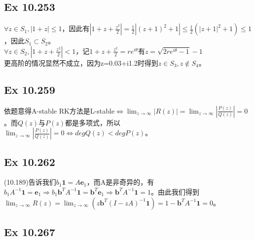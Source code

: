 \documentclass{article}
\begin{document}
\subsection*{Ex 10.253}
\indent $\forall z\in S_1,|1+z|\le 1$，因此有$|1+z+\frac{z^2}{2}|=\frac{1}{2}|(z+1)^2+1|\le \frac{1}{2}(|z+1|^2+1)\le1$，因此$S_1\subset S_2$。\\
\indent $\forall z\in S_2,|1+z+\frac{z^2}{2}|<1$，记$1+z+\frac{z^2}{2}=re^{i\theta}$有$z=\sqrt{2re^{i\theta}-1}-1$\\
\indent 更高阶的情况显然不成立，因为z=0.03+i1.2时得到$z\in S_3,z\notin S_4$。


\subsection*{Ex 10.259}
\indent 依题意得A-stable RK方法是L-stable$\Leftrightarrow$$\lim_{z\rightarrow\infty}|R(z)|=\lim_{z\rightarrow\infty}|\frac{P(z)}{Q(z)}|=0$。而$Q(z)$与$P(z)$都是多项式，所以$\lim_{z\rightarrow\infty}|\frac{P(z)}{Q(z)}|=0\Leftrightarrow degQ(z)<degP(z)$。

\subsection*{Ex 10.262}
\indent (10.189)告诉我们$b_1\textbf{1}=A\textbf{e}_1$，而A是非奇异的，有$b_1A^{-1}\textbf{1}=\textbf{e}_1\Rightarrow b_1\textbf{b}^TA^{-1}\textbf{1}=\textbf{b}^T\textbf{e}_1\Rightarrow\textbf{b}^TA^{-1}\textbf{1}=1$。由此我们得到$\lim_{z\rightarrow\infty}R(z)=\lim_{z\rightarrow\infty}(z\textbf{b}^T(I-zA)^{-1}\textbf{1})=1-\textbf{b}^TA^{-1}\textbf{1}=0$。

\subsection*{Ex 10.267}
\end{document}
